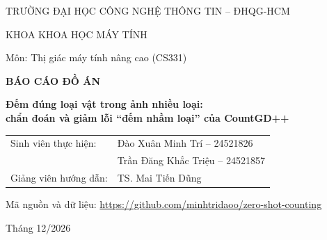 \documentclass[12pt,a4paper]{article}
\begin{document}
\begin{titlepage}
\centering
{\large TRƯỜNG ĐẠI HỌC CÔNG NGHỆ THÔNG TIN -- ĐHQG-HCM\par}
{\large KHOA KHOA HỌC MÁY TÍNH\par}
\vspace{4mm}
{\large Môn: Thị giác máy tính nâng cao (CS331)\par}
\vspace{30mm}
{\Large\bfseries BÁO CÁO ĐỒ ÁN\par}
\vspace{8mm}
{\LARGE\bfseries Đếm đúng loại vật trong ảnh nhiều loại:\\[2mm]
chẩn đoán và giảm lỗi ``đếm nhầm loại'' của CountGD++\par}
\vspace{25mm}
\begin{tabular}{ll}
Sinh viên thực hiện: & Đào Xuân Minh Trí -- 24521826\\
                     & Trần Đăng Khắc Triệu -- 24521857\\[2mm]
Giảng viên hướng dẫn: & TS. Mai Tiến Dũng\\
\end{tabular}
\vfill
{Mã nguồn và dữ liệu: \url{https://github.com/minhtridaoo/zero-shot-counting}\par}
\vspace{3mm}
{Tháng 12/2026\par}
\end{titlepage}
\end{document}
